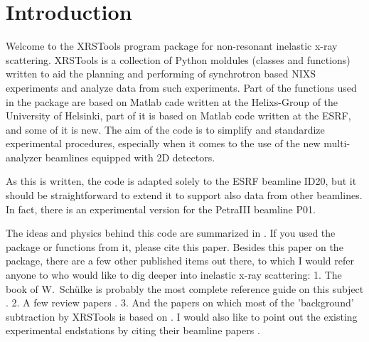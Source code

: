 \documentclass[aps,prl,groupedaddress]{revtex4}
\begin{document}

\section{Introduction}
Welcome to the XRSTools program package for non-resonant inelastic x-ray scattering. XRSTools is a collection of Python moldules (classes and functions) written to aid the planning and performing of synchrotron based NIXS experiments and analyze data from such experiments. Part of the functions used in the package are based on Matlab cade written at the Helixs-Group of the University of Helsinki, part of it is based on Matlab code written at the ESRF, and some of it is new. The aim of the code is to simplify and standardize experimental procedures, especially when it comes to the use of the new multi-analyzer beamlines equipped with 2D detectors. 

As this is written, the code is adapted solely to the ESRF beamline ID20, but it should be straightforward to extend it to support also data from other beamlines. In fact, there is an experimental version for the PetraIII beamline P01.

The ideas and physics behind this code are summarized in \cite{XRSTools_paper}. If you used the package or functions from it, please cite this paper. Besides this paper on the package, there are a few other published items out there, to which I would refer anyone to who would like to dig deeper into inelastic x-ray scattering: 1. The book of W.~Sch\"ulke is probably the most complete reference guide on this subject \cite{schuelke2007book}. 2. A few review papers \cite{hamalainen2001,sinha2001}. 3. And the papers on which most of the 'background' subtraction by XRSTools is based on \cite{sternemann2008,huotari2012}. I would also like to point out the existing experimental endstations by citing their beamline papers \cite{Cai2004,Fister2006,Verbeni2009,Sokaras2012,hiraoka2013}.
\end{document}
